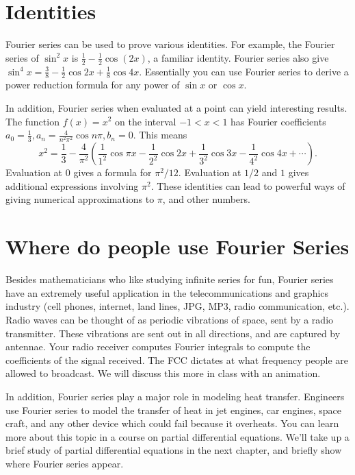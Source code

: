 {\section{Identities}
Fourier series can be used to prove various identities.  For example, the Fourier series of $\sin^2 x$ is $\frac{1}{2}-\frac{1}{2}\cos(2x)$, a familiar identity.  Fourier series also give $\sin^4 x =  \frac{3}{8}-\frac{1}{2} \cos 2 x+\frac{1}{8} \cos 4 x$.  Essentially you can use Fourier series to derive a power reduction formula for any power of $\sin x$ or $\cos x$.    

In addition, Fourier series when evaluated at a point can yield interesting results. The function $f(x)=x^2$ on the interval $-1<x<1$ has Fourier coefficients $a_0=\frac{1}{3}, a_n=\frac{4}{n^2\pi^2}\cos n\pi, b_n=0$.  This means $$x^2 = \frac{1}{3}-\frac{4}{\pi^2}\left(\frac{1}{1^2}\cos \pi x -\frac{1}{2^2}\cos 2x +\frac{1}{3^2}\cos 3x-\frac{1}{4^2}\cos 4x +\cdots\right).$$  Evaluation at $0$ gives a formula for $\pi^2/12$.  Evaluation at $1/2$ and $1$ gives additional expressions involving $\pi^2$. These identities can lead to powerful ways of giving numerical approximations to $\pi$, and other numbers.

\section{Where do people use Fourier Series}
Besides mathematicians who like studying infinite series for fun, Fourier series have an extremely useful application in the telecommunications and graphics industry (cell phones, internet, land lines, JPG, MP3, radio communication, etc.).  Radio waves can be thought of as periodic vibrations of space, sent by a radio transmitter.  These vibrations are sent out in all directions, and are captured by antennae.  Your radio receiver computes Fourier integrals to compute the coefficients of the signal received.  The FCC dictates at what frequency people are allowed to broadcast.  We will discuss this more in class with an animation.

In addition, Fourier series play a major role in modeling heat transfer. Engineers use Fourier series to model the transfer of heat in jet engines, car engines, space craft, and any other device which could fail because it overheats.  You can learn more about this topic in a course on partial differential equations.  We'll take up a brief study of partial differential equations in the next chapter, and briefly show where Fourier series appear. 


}